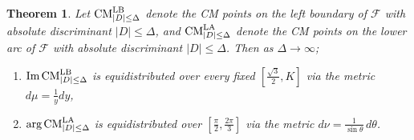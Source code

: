 \documentclass[11pt,letterpaper,reqno]{amsart}
\newtheorem{theorem}{Theorem}[section]
\numberwithin{equation}{section}
\numberwithin{figure}{section}
\numberwithin{table}{section}
\newcommand{\FF}{\mathcal{F}}
\newcommand{\CM}{\textnormal{CM}}
\begin{document}
{
\renewcommand{\thetheorem}{\ref{thm:equidistribution-boundary}}
\begin{theorem} 
    Let $\CM^\textnormal{LB}_{|D| \le \Delta}$ denote the CM points on the left boundary of $\FF$ with absolute discriminant $|D| \le \Delta$, and $\CM^\textnormal{LA}_{|D| \le \Delta}$ denote the CM points on the lower arc of $\FF$ with absolute discriminant $|D| \le \Delta$. Then as $\Delta \to \infty$;
    \begin{enumerate}[leftmargin=*]
        \item $\textnormal{Im\,} \CM^\textnormal{LB}_{|D|\le \Delta}$ is equidistributed over every fixed $[\frac{\sqrt 3}{2}, K]$ via the metric $d\mu = \frac{1}{y}dy$,
        \item $\textnormal{arg\,} \CM^\textnormal{LA}_{|D|\le \Delta}$ is equidistributed over $[\frac{\pi}{2}, \frac{2\pi}{3}]$ via the metric $d\nu = \frac{1}{\sin \theta} \,d\theta$.
    \end{enumerate}
\end{theorem}
\addtocounter{theorem}{-1}
}
\end{document}
